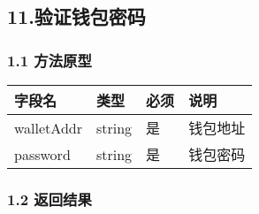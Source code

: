 \documentclass[letterpaper,10pt,english]{sphinxmanual}
\begin{document}

\begin{sphinxVerbatim}[commandchars=\\\{\}]
     
\end{sphinxVerbatim}


\subsection{11.验证钱包密码}
\label{\detokenize{BCBWalletSDK_u63a5_u53e3_u8bf4_u660e:id47}}

\subsubsection{1.1 方法原型}
\label{\detokenize{BCBWalletSDK_u63a5_u53e3_u8bf4_u660e:id48}}



\begin{savenotes}\sphinxattablestart
\centering
\begin{tabulary}{\linewidth}[t]{|T|T|T|T|}
\hline
\sphinxstyletheadfamily 
字段名
&\sphinxstyletheadfamily 
类型
&\sphinxstyletheadfamily 
必须
&\sphinxstyletheadfamily 
说明
\\
\hline
walletAddr
&
string
&
是
&
钱包地址
\\
\hline
password
&
string
&
是
&
钱包密码
\\
\hline
\end{tabulary}
\par
\sphinxattableend\end{savenotes}


\subsubsection{1.2 返回结果}
\label{\detokenize{BCBWalletSDK_u63a5_u53e3_u8bf4_u660e:id49}}

\begin{sphinxVerbatim}[commandchars=\\\{\}]
     
     
\end{sphinxVerbatim}
\end{document}
